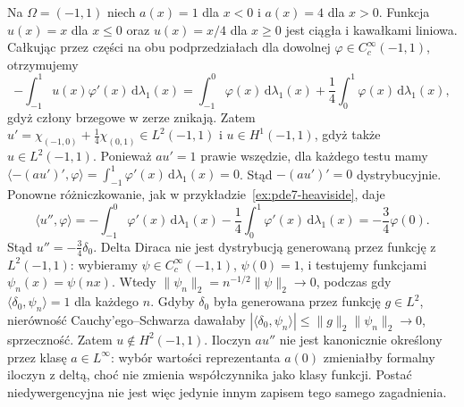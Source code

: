 \begin{przyklad}
\label{ex:pde13-interface}
Na $\Omega=(-1,1)$ niech $a(x)=1$ dla $x<0$ i $a(x)=4$ dla $x>0$.
Funkcja $u(x)=x$ dla $x\le0$ oraz $u(x)=x/4$ dla $x\ge0$
jest ciągła i kawałkami liniowa. Całkując przez części na obu
podprzedziałach dla dowolnej $\varphi\in C_c^\infty(-1,1)$,
otrzymujemy
\[
 -\int_{-1}^1u(x)\varphi'(x)\,\mathrm d\lambda_1(x)
 =\int_{-1}^0\varphi(x)\,\mathrm d\lambda_1(x)
 +\frac14\int_0^1\varphi(x)\,\mathrm d\lambda_1(x),
\]
gdyż człony brzegowe w zerze znikają. Zatem
$u'=\chi_{(-1,0)}+\tfrac14\chi_{(0,1)}\in L^2(-1,1)$
i $u\in H^1(-1,1)$, gdyż także $u\in L^2(-1,1)$.
Ponieważ $au'=1$ prawie wszędzie, dla każdego testu mamy
$\langle-(au')',\varphi\rangle=\int_{-1}^1
\varphi'(x)\,\mathrm d\lambda_1(x)=0$.
Stąd $-(au')'=0$ dystrybucyjnie.
Ponowne różniczkowanie, jak w przykładzie~\ref{ex:pde7-heaviside},
daje
\[
 \langle u'',\varphi\rangle
 =-\int_{-1}^0\varphi'(x)\,\mathrm d\lambda_1(x)
 -\frac14\int_0^1\varphi'(x)\,\mathrm d\lambda_1(x)
 =-\frac34\varphi(0).
\]
Stąd $u''=-\tfrac34\delta_0$. Delta Diraca nie jest
dystrybucją generowaną przez funkcję z $L^2(-1,1)$:
wybieramy $\psi\in C_c^\infty(-1,1)$, $\psi(0)=1$,
i testujemy funkcjami $\psi_n(x)=\psi(nx)$. Wtedy
$\|\psi_n\|_2=n^{-1/2}\|\psi\|_2\to0$, podczas gdy
$\langle\delta_0,\psi_n\rangle=1$ dla każdego $n$.
Gdyby $\delta_0$ była generowana przez funkcję $g\in L^2$,
nierówność Cauchy'ego--Schwarza dawałaby
$|\langle\delta_0,\psi_n\rangle|\le\|g\|_2\|\psi_n\|_2\to0$,
sprzeczność. Zatem $u\notin H^2(-1,1)$.
Iloczyn $a u''$ nie jest kanonicznie określony przez klasę
$a\in L^\infty$: wybór wartości reprezentanta $a(0)$
zmieniałby formalny iloczyn z deltą, choć nie zmienia
współczynnika jako klasy funkcji. Postać niedywergencyjna
nie jest więc jedynie innym zapisem tego samego zagadnienia.
\end{przyklad}

